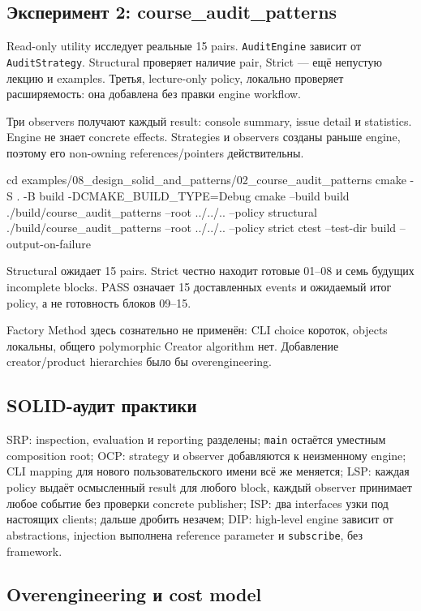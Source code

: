 \subsection{Эксперимент 2: course\_audit\_patterns}

Read-only utility исследует реальные 15 pairs. \texttt{AuditEngine} зависит
от \texttt{AuditStrategy}. Structural проверяет наличие pair, Strict --- ещё
непустую лекцию и examples. Третья, lecture-only policy, локально проверяет
расширяемость: она добавлена без правки engine workflow.

Три observers получают каждый result: console summary, issue detail и
statistics. Engine не знает concrete effects. Strategies и observers созданы
раньше engine, поэтому его non-owning references/pointers действительны.
\begin{shellcode}
cd examples/08_design_solid_and_patterns/02_course_audit_patterns
cmake -S . -B build -DCMAKE_BUILD_TYPE=Debug
cmake --build build
./build/course_audit_patterns --root ../../.. --policy structural
./build/course_audit_patterns --root ../../.. --policy strict
ctest --test-dir build --output-on-failure
\end{shellcode}
Structural ожидает 15 pairs. Strict честно находит готовые 01--08 и семь
будущих incomplete blocks. PASS означает 15 доставленных events и ожидаемый
итог policy, а не готовность блоков 09--15.

Factory Method здесь сознательно не применён: CLI choice короток, objects
локальны, общего polymorphic Creator algorithm нет. Добавление creator/product
hierarchies было бы overengineering.

\subsection{SOLID-аудит практики}
SRP: inspection, evaluation и reporting разделены; \texttt{main} остаётся уместным composition root; OCP: strategy и observer добавляются к неизменному engine; CLI mapping для нового пользовательского имени всё же меняется; LSP: каждая policy выдаёт осмысленный result для любого block, каждый observer принимает любое событие без проверки concrete publisher; ISP: два interfaces узки под настоящих clients; дальше дробить незачем; DIP: high-level engine зависит от abstractions, injection выполнена reference parameter и \texttt{subscribe}, без framework.

\subsection{Overengineering и cost model}

